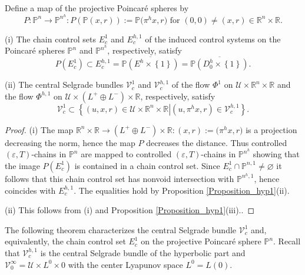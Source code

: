 \documentclass{siamltex}%
\begin{document}
Define a map of the projective Poincar\'{e} spheres by%
\begin{equation}
P:\mathbb{P}^{n}\rightarrow\mathbb{P}^{n^{h}}:P(\mathbb{P}(x,r)):=\mathbb{P(}%
\pi^{h}x,r)\text{ for }(0,0)\not =(x,r)\in\mathbb{R}^{n}\times\mathbb{R}.
\label{P1}%
\end{equation}


\begin{proposition}
\label{Proposition_hyp2}(i) The chain control sets $E_{c}^{1}$ and
$E_{c}^{h,1}$ of the induced control systems on the Poincar\'{e} spheres
$\mathbb{P}^{n}$ and $\mathbb{P}^{n^{h}}$, respectively, satisfy%
\[
P(E_{c}^{1})\subset E_{c}^{h,1}=\overline{\mathbb{P}\left(  E^{h}%
\times\left\{  1\right\}  \right)  }=\overline{\mathbb{P}\left(  D_{0}%
^{h}\times\left\{  1\right\}  \right)  }.
\]


(ii) The central Selgrade bundles $\mathcal{V}_{c}^{1}$ and $\mathcal{V}%
_{c}^{h,1}$ of the flow $\Phi^{1}$ on $\mathcal{U}\times\mathbb{R}^{n}%
\times\mathbb{R}$ and the flow $\Phi^{h,1}$ on $\mathcal{U}\times\left(
L^{+}\oplus L^{-}\right)  \times\mathbb{R}$, respectively, satisfy%
\[
\mathcal{V}_{c}^{1}\subset\left\{  (u,x,r)\in\mathcal{U}\times\mathbb{R}%
^{n}\times\mathbb{R}\left\vert (u,\pi^{h}x,r)\in\mathcal{V}_{c}^{h,1}\right.
\right\}  .
\]

\end{proposition}

\begin{proof}
(i) The map $\mathbb{R}^{n}\times\mathbb{R}\rightarrow\left(  L^{+}\oplus
L^{-}\right)  \times\mathbb{R}:(x,r):=\mathbb{(}\pi^{h}x,r)$ is a projection
decreasing the norm, hence the map $P$ decreases the distance. Thus controlled
$(\varepsilon,T)$-chains in $\mathbb{P}^{n}$ are mapped to controlled
$(\varepsilon,T)$-chains in $\mathbb{P}^{n^{h}}$ showing that the image
$P(E_{c}^{1})$ is contained in a chain control set. Since $E_{c}^{1}%
\cap\mathbb{P}^{n,1}\not =\varnothing$ it follows that this chain control set
has nonvoid intersection with $\mathbb{P}^{n^{h},1}$, hence coincides with
$E_{c}^{h,1}$. The equalities hold by Proposition \ref{Proposition_hyp1}(ii).

(ii) This follows from (i) and Proposition \ref{Proposition_hyp1}(iii)..
\end{proof}

The following theorem characterizes the central Selgrade bundle $\mathcal{V}%
_{c}^{1}$ and, equivalently, the chain control set $E_{c}^{1}$ on the
projective Poincar\'{e} sphere $\mathbb{P}^{n}$. Recall that $\mathcal{V}%
_{c}^{h,1}$ is the central Selgrade bundle of the hyperbolic part and
$\mathcal{V}_{0}^{\infty}=\mathcal{U}\times L^{0}\times0$ with the center
Lyapunov space $L^{0}=L(0)$.
\end{document}
